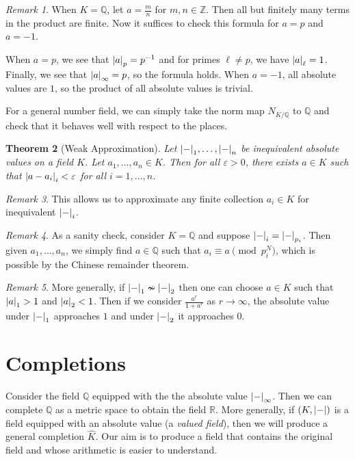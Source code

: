 \documentclass[leqno, openany]{memoir}
\newtheorem{thm}{Theorem}[section]
\theoremstyle{definition}
\theoremstyle{remark}
\newtheorem{rmk}[thm]{Remark}
\theoremstyle{plain}
\theoremstyle{definition}
\theoremstyle{remark}
\newcommand{\R}{\mathbb{R}}
\newcommand{\Z}{\mathbb{Z}}
\newcommand{\Q}{\mathbb{Q}}
\newcommand{\ep}{\varepsilon}
\newcommand{\wh}[1]{\widehat{#1}}
\begin{document}
\begin{rmk} When $K = \Q$, let $a = \frac{m}{n}$ for $m,n \in \Z$. Then all but
    finitely many terms in the product are finite. Now it suffices to check
    this formula for $a = p$ and $a = -1$.

    When $a = p$, we see that $\abs{a}_p = p^{-1}$ and for primes $\ell \neq
    p$, we have $\abs{a}_{\ell} = 1$. Finally, we see that $\abs{a}_{\infty} =
    p$, so the formula holds. When $a = -1$, all absolute values are $1$, so
    the product of all absolute values is trivial.

    For a general number field, we can simply take the norm map $N_{K/\Q}$ to
$\Q$ and check that it behaves well with respect to the places.  \end{rmk}

\begin{thm}[Weak Approximation] Let $\abs{-}_1, \ldots, \abs{-}_n$ be
    inequivalent absolute values on a field $K$. Let $a_1, \ldots, a_n \in K$.
    Then for all $\ep > 0$, there exists $a \in K$ such that $\abs{a-a_i}_i <
    \ep$ for all $i = 1, \ldots, n$.  \end{thm}

\begin{rmk} This allows us to approximate any finite collection $a_i \in K$ for
inequivalent $\abs{-}_i$.  \end{rmk}

\begin{rmk} As a sanity check, consider $K = \Q$ and suppose $\abs{-}_i =
\abs{-}_{p_i}$. Then given $a_1, \ldots, a_n$, we simply find $a \in \Q$ such
that $a_i \equiv a \pmod p_i^N$, which is possible by the Chinese remainder
theorem.  \end{rmk}

\begin{rmk} More generally, if $\abs{-}_1 \nsim \abs{-}_2$ then one can choose
    $a \in K$ such that $\abs{a}_1 > 1$ and $\abs{a}_2 < 1$. Then if we
    consider $\frac{a^r}{1+a^r}$ as $r \to \infty$, the absolute value under
    $\abs{-}_1$ approaches $1$ and under $\abs{-}_2$ it approaches $0$.
\end{rmk}

\section{Completions}%

Consider the field $\Q$ equipped with the the absolute value
$\abs{-}_{\infty}$. Then we can complete $\Q$ as a metric space to obtain the
field $\R$. More generally, if $(K, \abs{-})$ is a field equipped with an
absolute value (a \textit{valued field}), then we will produce a general
completion $\wh{K}$. Our aim is to produce a field that contains the original
field and whose arithmetic is easier to understand.
\end{document}
